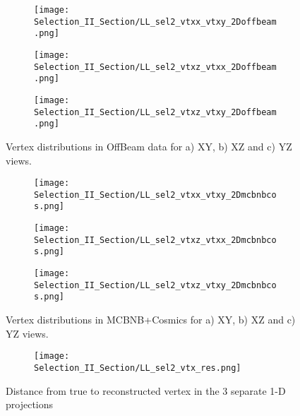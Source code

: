 \begin{figure}[t!]
\centering
  \begin{subfigure}[t]{0.26\textwidth}
    \centering
\texttt{[image: Selection\_II\_Section/LL\_sel2\_vtxx\_vtxy\_2Doffbeam.png]}
    \caption{ }
  \end{subfigure} 
  \hspace{10 mm}
  \begin{subfigure}[t]{0.26\textwidth}
    \centering
\texttt{[image: Selection\_II\_Section/LL\_sel2\_vtxz\_vtxx\_2Doffbeam.png]}
    \caption{ }
  \end{subfigure} 
  \hspace{10 mm}
  \begin{subfigure}[t]{0.26\textwidth}
    \centering
\texttt{[image: Selection\_II\_Section/LL\_sel2\_vtxz\_vtxy\_2Doffbeam.png]}
    \caption{ }
  \end{subfigure} 

\caption{ Vertex distributions in OffBeam data for a) XY, b) XZ and c) YZ views. }
\label{fig:ll_sel2_vertices_offbeam}
\end{figure}

\begin{figure}[h!]
\centering
  \begin{subfigure}[t]{0.26\textwidth}
    \centering
\texttt{[image: Selection\_II\_Section/LL\_sel2\_vtxx\_vtxy\_2Dmcbnbcos.png]}
    \caption{ }
  \end{subfigure} 
  \hspace{10 mm}
  \begin{subfigure}[t]{0.26\textwidth}
    \centering
\texttt{[image: Selection\_II\_Section/LL\_sel2\_vtxz\_vtxx\_2Dmcbnbcos.png]}
    \caption{ }
  \end{subfigure} 
  \hspace{10 mm}
  \begin{subfigure}[t]{0.26\textwidth}
    \centering
\texttt{[image: Selection\_II\_Section/LL\_sel2\_vtxz\_vtxy\_2Dmcbnbcos.png]}
    \caption{ }
  \end{subfigure} 
\caption{ Vertex distributions in MCBNB+Cosmics for a) XY, b) XZ and c) YZ views. }
\label{fig:ll_sel2_vertices_mc}
\end{figure}


\begin{figure}[t!]
\centering
 \begin{subfigure}[t]{0.6\textwidth}
    \centering
\texttt{[image: Selection\_II\_Section/LL\_sel2\_vtx\_res.png]}
    \caption{ }
  \end{subfigure} 

\caption{Distance from true to reconstructed vertex in the 3 separate 1-D projections }
\label{fig:physics_sel2_vtxres}
\end{figure}


